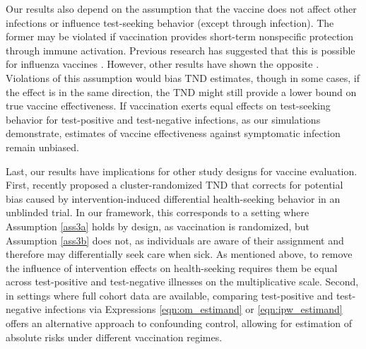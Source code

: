 \documentclass[11pt]{article}
\begin{document}
Our results also depend on the assumption that the vaccine does not affect other infections or influence test-seeking behavior (except through infection). The former may be violated if vaccination provides short-term nonspecific protection through immune activation. Previous research has suggested that this is possible for influenza vaccines \cite{cowling_increased_2012}. However, other results have shown the opposite \cite{sundaram_influenza_2013}. Violations of this assumption would bias TND estimates, though in some cases, if the effect is in the same direction, the TND might still provide a lower bound on true vaccine effectiveness. If vaccination exerts equal effects on test-seeking behavior for test-positive and test-negative infections, as our simulations demonstrate, estimates of vaccine effectiveness against symptomatic infection remain unbiased. 


Last, our results have implications for other study designs for vaccine evaluation. First, \textcite{wang_randomization_2022} recently proposed a cluster-randomized TND that corrects for potential bias caused by intervention-induced differential health-seeking behavior in an unblinded trial. In our framework, this corresponds to a setting where Assumption \ref{ass3a} holds by design, as vaccination is randomized, but Assumption \ref{ass3b} does not, as individuals are aware of their assignment and therefore may differentially seek care when sick. As mentioned above, to remove the influence of intervention effects on health-seeking requires them be equal across test-positive and test-negative illnesses on the multiplicative scale. Second, in settings where full cohort data are available, comparing test-positive and test-negative infections via Expressions \ref{eqn:om_estimand} or \ref{eqn:ipw_estimand} offers an alternative approach to confounding control, allowing for estimation of absolute risks under different vaccination regimes. 
\end{document}
